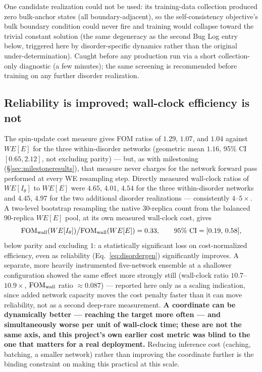 \documentclass[11pt,a4paper]{article}
\begin{document}
One candidate realization could not be used: its training-data collection produced zero
bulk-anchor states (all boundary-adjacent), so the self-consistency objective's bulk boundary
condition could never fire and training would collapse toward the trivial constant solution
(the same degeneracy as the second Bug Log entry below, triggered here by disorder-specific
dynamics rather than the original under-determination). Caught before any production run via a
short collection-only diagnostic (a few minutes); the same screening is recommended before
training on any further disorder realization.

\subsection{Reliability is improved; wall-clock efficiency is not}\label{sec:costdisc}
The spin-update cost measure gives FOM ratios of $1.29$, $1.07$, and $1.04$ against $WE[E]$ for
the three within-disorder networks (geometric mean $1.16$, 95\% CI $[0.65,2.12]$, not excluding
parity) --- but, as with milestoning (\S\ref{sec:milestoneresults}), that measure never charges
for the network forward pass performed at every WE resampling step. Directly measured wall-clock
ratios of $WE[I_\theta]$ to $WE[E]$ were $4.65$, $4.01$, $4.54$ for the three within-disorder
networks and $4.45$, $4.97$ for the two additional disorder realizations --- consistently
$4$--$5\times$. A two-level bootstrap resampling the native 30-replica count from the balanced
90-replica $WE[E]$ pool, at its own measured wall-clock cost, gives
\begin{equation}
\mathrm{FOM}_{\rm wall}(WE[I_\theta])\big/\mathrm{FOM}_{\rm wall}(WE[E]) = 0.33,\qquad
95\%\ \mathrm{CI}=[0.19,\,0.58],
\label{eq:fomwall}
\end{equation}
below parity and excluding $1$: a statistically significant loss on cost-normalized efficiency,
even as reliability (Eq.~\ref{eq:disordergen}) significantly improves. A separate, more heavily
instrumented five-network ensemble at a shallower configuration showed the same effect more
strongly still (wall-clock ratio $10.7$--$10.9\times$, $\mathrm{FOM}_{\rm wall}$ ratio
$\approx0.087$) --- reported here only as a scaling indication, since added network capacity moves
the cost penalty faster than it can move reliability, not as a second deep-rare measurement.
\textbf{A coordinate can be dynamically better --- reaching the target more often --- and
simultaneously worse per unit of wall-clock time; these are not the same axis, and this project's
own earlier cost metric was blind to the one that matters for a real deployment.} Reducing
inference cost (caching, batching, a smaller network) rather than improving the coordinate
further is the binding constraint on making this practical at this scale.
\end{document}
